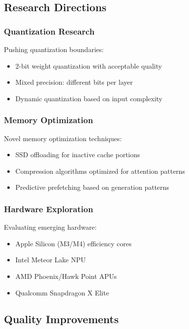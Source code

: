 \subsection{Research Directions}

\subsubsection{Quantization Research}

Pushing quantization boundaries:

\begin{itemize}
    \item 2-bit weight quantization with acceptable quality
    \item Mixed precision: different bits per layer
    \item Dynamic quantization based on input complexity
\end{itemize}

\subsubsection{Memory Optimization}

Novel memory optimization techniques:

\begin{itemize}
    \item SSD offloading for inactive cache portions
    \item Compression algorithms optimized for attention patterns
    \item Predictive prefetching based on generation patterns
\end{itemize}

\subsubsection{Hardware Exploration}

Evaluating emerging hardware:

\begin{itemize}
    \item Apple Silicon (M3/M4) efficiency cores
    \item Intel Meteor Lake NPU
    \item AMD Phoenix/Hawk Point APUs
    \item Qualcomm Snapdragon X Elite
\end{itemize}

\subsection{Quality Improvements}

